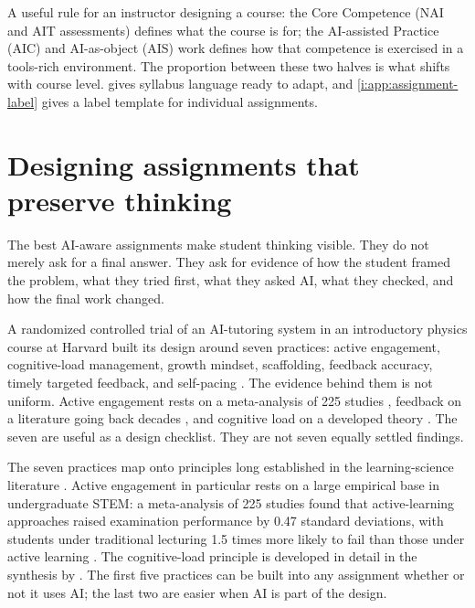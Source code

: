 \documentclass{SIAMbook2023}
\begin{document}
A useful rule for an instructor designing a course: the Core Competence (NAI and AIT assessments) defines what the course is for; the AI-assisted Practice (AIC) and AI-as-object (AIS) work defines how that competence is exercised in a tools-rich environment. The proportion between these two halves is what shifts with course level.  gives syllabus language ready to adapt, and \cref{i:app:assignment-label} gives a label template for individual assignments.

\section{Designing assignments that preserve thinking}
\label{i:sec:assignment-design}%

The best AI-aware assignments make student thinking visible. They do not merely ask for a final answer. They ask for evidence of how the student framed the problem, what they tried first, what they asked AI, what they checked, and how the final work changed.

A randomized controlled trial of an AI-tutoring system in an introductory physics course at Harvard built its design around seven practices: active engagement, cognitive-load management, growth mindset, scaffolding, feedback accuracy, timely targeted feedback, and self-pacing \citep{kestin2025ai}. The evidence behind them is not uniform. Active engagement rests on a meta-analysis of 225 studies \citep{freeman2014active}, feedback on a literature going back decades \citep{black1998assessment,hattie2007power}, and cognitive load on a developed theory \citep{sweller2011cognitive}. The seven are useful as a design checklist. They are not seven equally settled findings.

The seven practices map onto principles long established in the learning-science literature \citep{ambrose2010how,nationalacademies2018how}. Active engagement in particular rests on a large empirical base in undergraduate STEM: a meta-analysis of 225 studies found that active-learning approaches raised examination performance by 0.47 standard deviations, with students under traditional lecturing 1.5 times more likely to fail than those under active learning \citep{freeman2014active}. The cognitive-load principle is developed in detail in the synthesis by \citet{sweller2011cognitive}. The first five practices can be built into any assignment whether or not it uses AI; the last two are easier when AI is part of the design.
\end{document}
